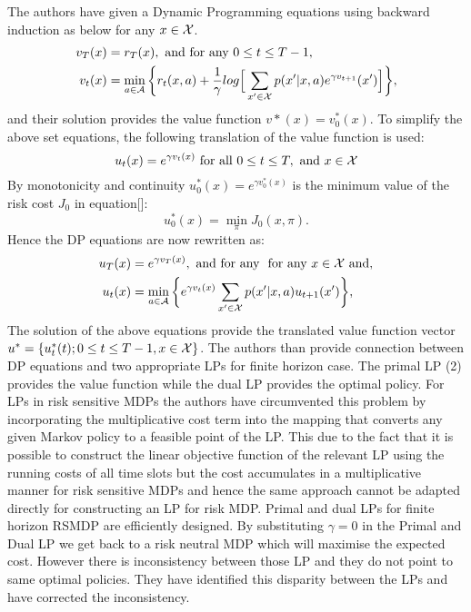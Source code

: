 \documentclass[11pt,a4paper,oneside]{report}
\begin{document}
The authors have given a Dynamic Programming equations using backward induction as below for any $x\in \cal{X}$.
\begin{align}
\begin{split}
v_T(x) &= r_T(x), \text{   and for any  } 0\leq t\leq T-1, \\ 
v_t(x) &=\min_{a\in \cal{A}}\bigg \lbrace r_t(x,a) + \frac{1}{\gamma}log\Big[\sum_{x'\in \cal{X}} p(x'|x,a)e^{\gamma v_{t+1}}(x')\Big]\bigg\rbrace, 
\end{split}
\label{eqn:1}
\end{align}
and their solution provides the value function $v*(x) = v_0^*(x)$. To simplify the above set equations, the following translation of the value function is used:
\begin{equation}
u_t(x) = e^{\gamma v_t(x)} \text{   for all } 0\leq t\leq T, \text{ and } x\in \cal{X}
\end{equation}
By monotonicity and continuity $u_0^*(x) = e^{\gamma v_0^*(x)}$ is the minimum value of the risk cost $J_0$ in equation[]:
\begin{equation}
u_0^*(x)=\min_\pi J_0(x,\pi).
\end{equation}
Hence the DP equations are now rewritten as:
\begin{align}
\begin{split}
u_T(x) &= e^{\gamma v_T(x)}, \text{   and for any  } \text{ for any } x\in \cal{X} \text{ and},\\
u_t(x) &=\min_{a\in \cal{A}}\bigg \lbrace e^{\gamma v_t(x)}\sum_{x'\in \cal{X}} p(x'|x,a)u_{t+1}(x')\bigg\rbrace, 
\end{split}
\label{eqn:1}
\end{align}
The solution of the above equations provide the translated value function vector $u^* = \lbrace u_t^*(t); 0\leq t\leq T-1, x\in \cal{X}\rbrace$. The authors than provide connection between DP equations and two appropriate LPs for finite horizon case. The primal LP (2) provides the value function while the dual LP provides the optimal policy. For LPs in risk sensitive MDPs the authors have circumvented this problem by incorporating the multiplicative cost term into the mapping that converts any given Markov policy to a feasible point of the LP. This due to the fact that it is possible to construct the linear objective function of the relevant LP using the running costs of all time slots but the cost accumulates in a multiplicative manner for risk sensitive MDPs and hence the same approach cannot be adapted directly for constructing an LP for risk MDP. Primal and dual LPs for finite horizon RSMDP are efficiently designed.  By substituting $\gamma=0$ in the Primal and Dual LP we get back to a risk neutral MDP which will maximise the expected cost. However there is inconsistency between those LP and they do not point to same optimal policies. They have identified this disparity between the LPs and have corrected the inconsistency.
\end{document}
